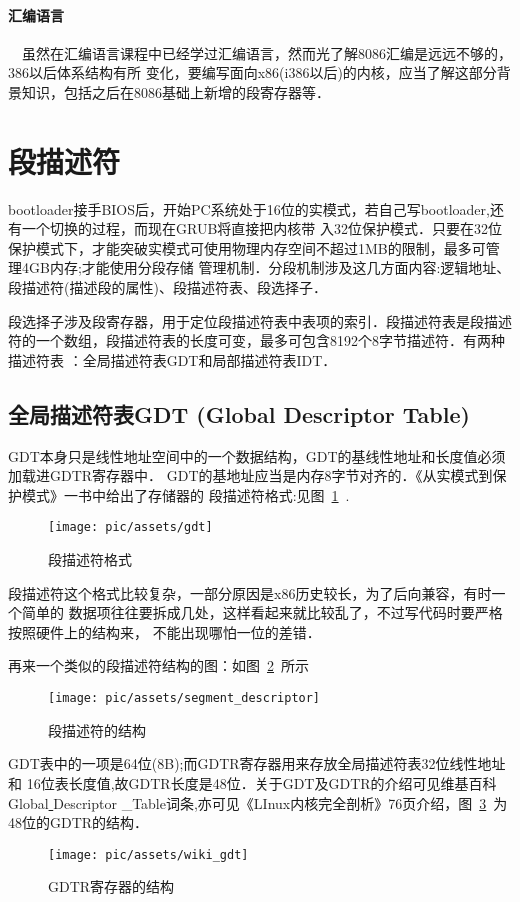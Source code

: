 \paragraph{汇编语言}　虽然在汇编语言课程中已经学过汇编语言，然而光了解8086汇编是远远不够的，386以后体系结构有所
变化，要编写面向x86(i386以后)的内核，应当了解这部分背景知识，包括之后在8086基础上新增的段寄存器等．

\section{段描述符}
bootloader接手BIOS后，开始PC系统处于16位的实模式，若自己写bootloader,还有一个切换的过程，而现在GRUB将直接把内核带
入32位保护模式．只要在32位保护模式下，才能突破实模式可使用物理内存空间不超过1MB的限制，最多可管理4GB内存;才能使用分段存储
管理机制．分段机制涉及这几方面内容:逻辑地址、段描述符(描述段的属性)、段描述符表、段选择子．

段选择子涉及段寄存器，用于定位段描述符表中表项的索引．段描述符表是段描述符的一个数组，段描述符表的长度可变，最多可包含8192个8字节描述符．有两种描述符表
：全局描述符表GDT和局部描述符表IDT．
\subsection{全局描述符表GDT (Global Descriptor Table)}

GDT本身只是线性地址空间中的一个数据结构，GDT的基线性地址和长度值必须加载进GDTR寄存器中．
GDT的基地址应当是内存8字节对齐的．《从实模式到保护模式》一书中给出了存储器的
段描述符格式:见图~\ref{gdt}~.

\begin{figure}[!htbp]
	\centering	\texttt{[image: pic/assets/gdt]}
    \caption{段描述符格式}	\label{gdt}	\end{figure}

段描述符这个格式比较复杂，一部分原因是x86历史较长，为了后向兼容，有时一个简单的
数据项往往要拆成几处，这样看起来就比较乱了，不过写代码时要严格按照硬件上的结构来，
不能出现哪怕一位的差错．



再来一个类似的段描述符结构的图：如图~\ref{segment_descriptor}~所示

\begin{figure}[!htbp]
	\centering	\texttt{[image: pic/assets/segment\_descriptor]}
    \caption{段描述符的结构}	\label{segment_descriptor}	\end{figure}


GDT表中的一项是64位(8B);而GDTR寄存器用来存放全局描述符表32位线性地址和
16位表长度值,故GDTR长度是48位．关于GDT及GDTR的介绍可见维基百科Global\underline{ }Descriptor
\_Table词条,亦可见《LInux内核完全剖析》76页介绍，图~\ref{wiki_gdt}~为48位的GDTR的结构．
\begin{figure}[!htbp]
	\centering	\texttt{[image: pic/assets/wiki\_gdt]}
    \caption{GDTR寄存器的结构}	\label{wiki_gdt}	\end{figure}
   

